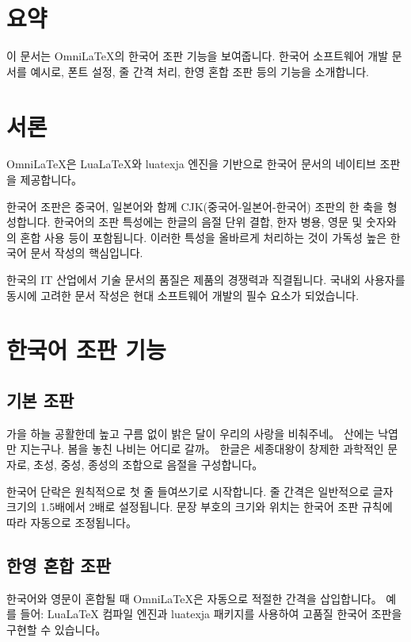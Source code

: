 \documentclass[
    language=korean,
    doctype=article,
    institution=none,
]{../../omnilatex}
\begin{document}
\maketitle

\section*{요약}
이 문서는 OmniLaTeX의 한국어 조판 기능을 보여줍니다. 한국어 소프트웨어 개발 문서를 예시로, 폰트 설정, 줄 간격 처리, 한영 혼합 조판 등의 기능을 소개합니다.

\tableofcontents

\section{서론}
OmniLaTeX은 LuaLaTeX와 luatexja 엔진을 기반으로 한국어 문서의 네이티브 조판을 제공합니다。

한국어 조판은 중국어, 일본어와 함께 CJK(중국어-일본어-한국어) 조판의 한 축을 형성합니다. 한국어의 조판 특성에는 한글의 음절 단위 결합, 한자 병용, 영문 및 숫자와의 혼합 사용 등이 포함됩니다. 이러한 특성을 올바르게 처리하는 것이 가독성 높은 한국어 문서 작성의 핵심입니다.

한국의 IT 산업에서 기술 문서의 품질은 제품의 경쟁력과 직결됩니다. 국내외 사용자를 동시에 고려한 문서 작성은 현대 소프트웨어 개발의 필수 요소가 되었습니다.

\section{한국어 조판 기능}

\subsection{기본 조판}
가을 하늘 공활한데 높고 구름 없이 밝은 달이 우리의 사랑을 비춰주네。
산에는 낙엽만 지는구나. 봄을 놓친 나비는 어디로 갈까。 한글은 세종대왕이 창제한 과학적인 문자로, 초성, 중성, 종성의 조합으로 음절을 구성합니다。

한국어 단락은 원칙적으로 첫 줄 들여쓰기로 시작합니다. 줄 간격은 일반적으로 글자 크기의 1.5배에서 2배로 설정됩니다. 문장 부호의 크기와 위치는 한국어 조판 규칙에 따라 자동으로 조정됩니다。

\subsection{한영 혼합 조판}
한국어와 영문이 혼합될 때 OmniLaTeX은 자동으로 적절한 간격을 삽입합니다。
예를 들어: LuaLaTeX 컴파일 엔진과 luatexja 패키지를 사용하여 고품질 한국어 조판을 구현할 수 있습니다。
\end{document}
